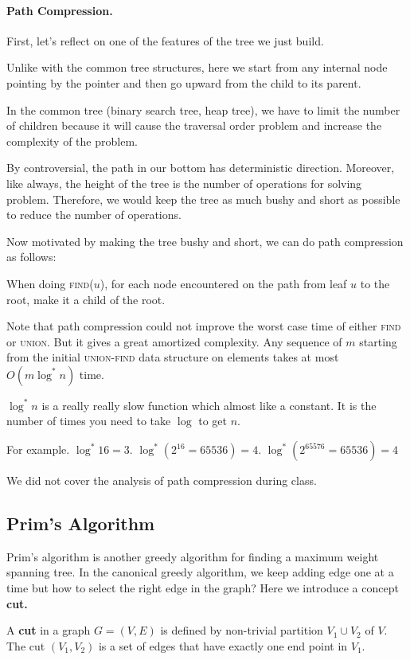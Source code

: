 \paragraph{Path Compression.}
First, let's reflect on one of the features of the tree we just build. 

Unlike with the common tree structures, here we start from any internal node pointing by the pointer and then go upward from the child to its parent. 

In the common tree (binary search tree, heap tree), we have to limit the number of children because it will cause the traversal order problem and increase the complexity of the problem.

By controversial, the path in our bottom has deterministic direction. Moreover, like always, the height of the tree is the number of operations for solving problem. Therefore, we would keep the tree as much bushy and short as possible to reduce the number of operations.

Now motivated by making the tree bushy and short, we can do path compression as follows:

When doing \textsc{find}($u$), for each node encountered on the path from leaf $u$ to the root, make it a child of the root.

Note that path compression could not improve the worst case time of either \textsc{find} or \textsc{union}. But it gives a great amortized complexity. Any sequence of $m$ starting from the initial \textsc{union-find} data structure on elements takes at most $O(m\log^*n)$ time.
\begin{definition}
	$\log^*n$ is a really really slow function which almost like a constant. It is the number of times you need to take $\log$ to get $n$.
\end{definition}
For example. $\log^* 16 = 3$. $\log^* (2^{16} = 65536) = 4$. $\log^* (2^{65576} = 65536) = 4$

We did not cover the analysis of path compression during class.
\subsection{Prim's Algorithm}
Prim's algorithm is another greedy algorithm for finding a maximum weight spanning tree. In the canonical greedy algorithm, we keep adding edge one at a time but how to select the right edge in the graph? Here we introduce a concept \textbf{cut.}

\begin{definition}
	A \textbf{cut} in a graph $G = (V, E)$ is defined by non-trivial partition $ V_1 \cup V_2 $ of $V$. The cut $ (V_1, V_2) $ is a set of edges that have exactly one end point in $ V_1 $.
\end{definition}

